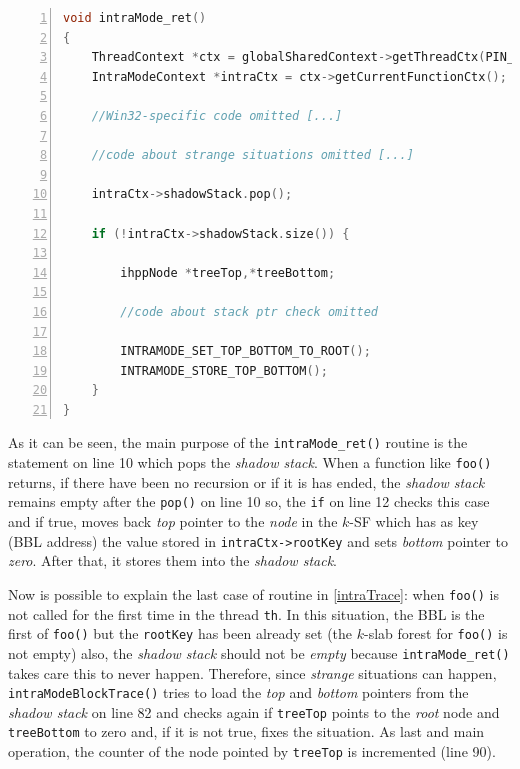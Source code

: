 \documentclass[a4paper,10pt]{report}
\begin{document}
\begin{lstlisting}[language=C++, 
	caption={partial implementation of \texttt{intraMode\_ret()}}, 
	label=intraRet, frame=leftline, numbers=left, showstringspaces=false]
void intraMode_ret() 
{
	ThreadContext *ctx = globalSharedContext->getThreadCtx(PIN_ThreadUid());
	IntraModeContext *intraCtx = ctx->getCurrentFunctionCtx();
	
	//Win32-specific code omitted [...]

	//code about strange situations omitted [...]

	intraCtx->shadowStack.pop();

	if (!intraCtx->shadowStack.size()) {

		ihppNode *treeTop,*treeBottom;

		//code about stack ptr check omitted
	
		INTRAMODE_SET_TOP_BOTTOM_TO_ROOT();
		INTRAMODE_STORE_TOP_BOTTOM();		
	}
}

\end{lstlisting}

\noindent
As it can be seen, the main purpose of the \verb|intraMode_ret()| routine
is the statement on line 10 which pops the \emph{shadow stack}.
When a function like \verb|foo()| returns, if there have been no recursion or if it 
is has ended, the \emph{shadow stack} remains empty after the \verb|pop()| on line 10 so,
the \verb|if| on line 12 checks this case and if true, moves back
\emph{top} pointer to the \emph{node} in the $k$-SF which 
has as key (BBL address) the value stored in \verb|intraCtx->rootKey| 
and sets \emph{bottom} pointer to \emph{zero}. After that, it stores them
into the \emph{shadow stack}.

Now is possible to explain the last case of routine in \cref{intraTrace}:
when \verb|foo()| is not called for the first time in the thread \verb|th|.
In this situation, the BBL is the first of \verb|foo()| but the \verb|rootKey| 
has been already set (the $k$-slab forest for \verb|foo()| is not empty) also,
the \emph{shadow stack} should not be \emph{empty} because \verb|intraMode_ret()|
takes care this to never happen. 
Therefore, since \emph{strange} situations can happen, \verb|intraModeBlockTrace()|
tries to load the \emph{top} and \emph{bottom} pointers from the \emph{shadow stack}
on line 82 and checks again if \verb|treeTop| points to the \emph{root} node 
and \verb|treeBottom| to zero and, if it is not true, fixes the situation.
As last and main operation, the counter of the node pointed by \verb|treeTop| 
is incremented (line 90).
\end{document}
